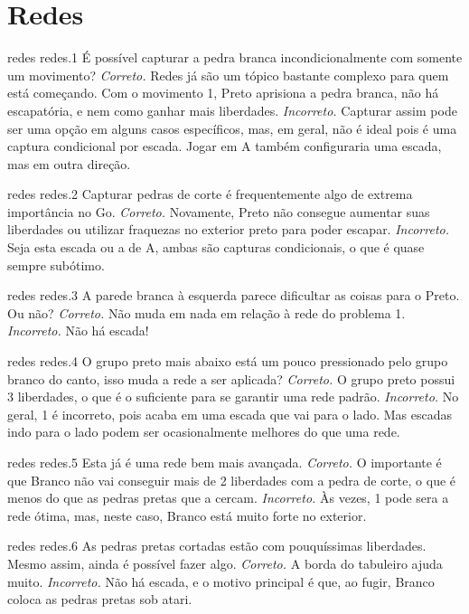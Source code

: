 \chapter{Redes}

\emptypage

\problemAnswerDiagram
  {redes}
  {redes.1}
  {É possível capturar a pedra branca incondicionalmente com somente um movimento?}
  {\emph{Correto.} Redes já são um tópico bastante complexo para quem está começando. Com o movimento 1, Preto aprisiona a pedra branca, não há escapatória, e nem como ganhar mais liberdades.}
  {\emph{Incorreto.} Capturar assim pode ser uma opção em alguns casos específicos, mas, em geral, não é ideal pois é uma captura condicional por escada. Jogar em A também configuraria uma escada, mas em outra direção.}

\problemAnswerDiagram
  {redes}
  {redes.2}
  {Capturar pedras de corte é frequentemente algo de extrema importância no Go.}
  {\emph{Correto.} Novamente, Preto não consegue aumentar suas liberdades ou utilizar fraquezas no exterior preto para poder escapar.}
  {\emph{Incorreto.} Seja esta escada ou a de A, ambas são capturas condicionais, o que é quase sempre subótimo.}

\problemAnswerDiagram
  {redes}
  {redes.3}
  {A parede branca à esquerda parece dificultar as coisas para o Preto. Ou não?}
  {\emph{Correto.} Não muda em nada em relação à rede do problema 1.}
  {\emph{Incorreto.} Não há escada!}

\problemAnswerDiagram
  {redes}
  {redes.4}
  {O grupo preto mais abaixo está um pouco pressionado pelo grupo branco do canto, isso muda a rede a ser aplicada?}
  {\emph{Correto.} O grupo preto possui 3 liberdades, o que é o suficiente para se garantir uma rede padrão.}
  {\emph{Incorreto.} No geral, 1 é incorreto, pois acaba em uma escada que vai para o lado. Mas escadas indo para o lado podem ser ocasionalmente melhores do que uma rede.}

\problemAnswerDiagram
  {redes}
  {redes.5}
  {Esta já é uma rede bem mais avançada.}
  {\emph{Correto.} O importante é que Branco não vai conseguir mais de 2 liberdades com a pedra de corte, o que é menos do que as pedras pretas que a cercam.}
  {\emph{Incorreto.} Às vezes, 1 pode sera a rede ótima, mas, neste caso, Branco está muito forte no exterior.}

\problemAnswerDiagram
  {redes}
  {redes.6}
  {As pedras pretas cortadas estão com pouquíssimas liberdades. Mesmo assim, ainda é possível fazer algo.}
  {\emph{Correto.} A borda do tabuleiro ajuda muito.}
  {\emph{Incorreto.} Não há escada, e o motivo principal é que, ao fugir, Branco coloca as pedras pretas sob atari.}
